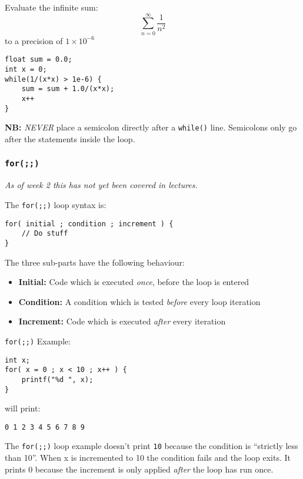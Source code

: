 \documentclass{lab}
\begin{document}
\begin{multicols}{2}
Evaluate the infinite sum:
\begin{equation}
\sum_{n=0}^{\infty} \frac{1}{n^2}
\end{equation}
to a precision of $1 \times 10^{-6}$
\begin{lstlisting}[style=CStyle]
float sum = 0.0;
int x = 0;
while(1/(x*x) > 1e-6) {
	sum = sum + 1.0/(x*x);
	x++
}
\end{lstlisting}

\textbf{NB:} \textit{NEVER} place a semicolon directly after a \texttt{while()} line. Semicolons only go after the statements inside the loop.

\subsubsection{\texttt{for(;;)}}\label{sec:for}

\textit{As of week 2 this has not yet been covered in lectures.}

The \texttt{for(;;)} loop syntax is:

\begin{lstlisting}[style=CStyle]
for( initial ; condition ; increment ) {
	// Do stuff
}
\end{lstlisting}

The three sub-parts have the following behaviour:

\begin{itemize}
\item \textbf{Initial:} Code which is executed \textit{once}, before the loop is entered
\item \textbf{Condition:} A condition which is tested \textit{before} every loop iteration
\item \textbf{Increment:} Code which is executed \textit{after} every iteration
\end{itemize}

\texttt{for(;;)} Example:

\begin{lstlisting}[style=CStyle]
int x;
for( x = 0 ; x < 10 ; x++ ) {
	printf("%d ", x);
}
\end{lstlisting}

will print:

\texttt{0 1 2 3 4 5 6 7 8 9}

The \texttt{for(;;)} loop example doesn't print \texttt{10} because the condition is ``strictly less than 10''. When x is incremented to 10 the condition fails and the loop exits. It prints 0 because the increment is only applied \textit{after} the loop has run once.



\end{multicols}
\end{document}
